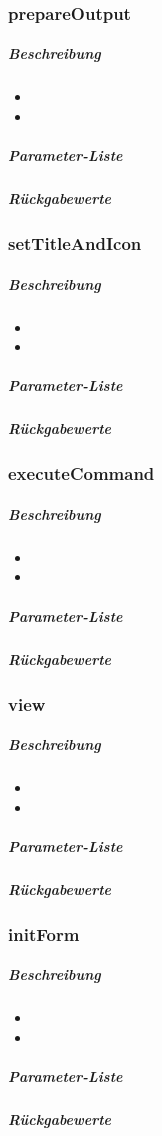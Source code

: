 \subsubsection*{prepareOutput}\label{prepareOutputGDGUI}
\subparagraph{Beschreibung}
\begin{itemize}
	\item[] \noindent{}
	\item[] 
\end{itemize}
\subparagraph{Parameter-Liste}
\subparagraph{Rückgabewerte}

\subsubsection*{setTitleAndIcon}\label{setTitleAndIconGDGUI}
\subparagraph{Beschreibung}
\begin{itemize}
	\item[] \noindent{}
	\item[] 
\end{itemize}
\subparagraph{Parameter-Liste}
\subparagraph{Rückgabewerte}

\subsubsection*{executeCommand}\label{executeCommandGDGUI}
\subparagraph{Beschreibung}
\begin{itemize}
	\item[] \noindent{}
	\item[] 
\end{itemize}
\subparagraph{Parameter-Liste}
\subparagraph{Rückgabewerte}

\subsubsection*{view}\label{viewGDGUI}
\subparagraph{Beschreibung}
\begin{itemize}
	\item[] \noindent{}
	\item[] 
\end{itemize}
\subparagraph{Parameter-Liste}
\subparagraph{Rückgabewerte}

\subsubsection*{initForm}\label{initFormGDGUI}
\subparagraph{Beschreibung}
\begin{itemize}
	\item[] \noindent{}
	\item[] 
\end{itemize}
\subparagraph{Parameter-Liste}
\subparagraph{Rückgabewerte}

